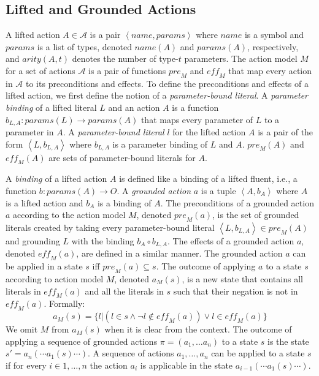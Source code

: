 \documentclass{article}
\newcommand{\tuple}[1]{\ensuremath{\left \langle #1 \right \rangle }}
\newcommand{\pre}{\textit{pre}}
\newcommand{\params}{\textit{params}}
\newcommand{\eff}{\textit{eff}}
\newcommand{\name}{\textit{name}}
\newcommand{\liftl}{L}
\newcommand{\lifta}{A}
\begin{document}
\subsection{Lifted and Grounded Actions}
A lifted action $\lifta\in \mathcal{A}$ is a pair $\tuple{\name, \params}$ 
where $\name$ is a symbol and $\params$ is a list of types, 
denoted $\name(\lifta)$ and $\params(\lifta)$, respectively, and $arity(\lifta,t)$ denotes the number of type-$t$ parameters. 
The action model $M$ for a set of actions $\mathcal{A}$ 
is a pair of functions $\pre_M$ and $\eff_M$ that map every action in $\mathcal{A}$ to its preconditions and effects. 
To define the preconditions and effects of a lifted action, 
we first define the notion of a \emph{parameter-bound literal}. 
A \emph{parameter binding} of a lifted literal $\liftl$ and an action $\lifta$ is a function $b_{\liftl,\lifta}: \params(\liftl)\rightarrow \params(\lifta)$ that maps every parameter of $\liftl$ to a parameter in $\lifta$. 
A \emph{parameter-bound literal} $l$ for the lifted action $\lifta$ is a 
pair of the form $\tuple{\liftl,b_{\liftl,\lifta}}$ where $b_{\liftl,\lifta}$ is a parameter binding of $\liftl$ and $\lifta$. 
$\pre_M(\lifta)$ and $\eff_M(\lifta)$ are sets of parameter-bound literals for $\lifta$. 




A \emph{binding} of a lifted action $\lifta$ is defined like a binding of a lifted fluent, i.e., a function $b:\params(\lifta)\rightarrow O$. 
A \emph{grounded action} $a$ is a tuple $\tuple{\lifta, b_\lifta}$ where $\lifta$ is a lifted action and $b_\lifta$ is a binding of $\lifta$. 
The preconditions of a grounded action $a$ according to the action model $M$, denoted $\pre_M(a)$, is the set of grounded literals created by taking every parameter-bound literal $\tuple{\liftl, b_{\liftl,\lifta}}\in \pre_M(\lifta)$ and grounding $\liftl$ with the binding $b_\lifta\circ b_{\liftl,\lifta}$. 
The effects of a grounded action $a$, denoted $\eff_M(a)$, are defined in a similar manner. 
The grounded action $a$ can be applied in a state $s$ iff $\pre_M(a)\subseteq s$. 
The outcome of applying $a$ to a state $s$ according to action model $M$, denoted $a_M(s)$, is a new state that contains all literals in $\eff_M(a)$ and all the literals in $s$ such that their negation is not in $\eff_M(a)$. 
Formally:
\begin{equation}
    a_M(s)=\{ l | (l\in s \wedge \neg l\notin \eff_M(a)) \vee l\in \eff_M(a) \} 
\end{equation}
We omit $M$ from $a_M(s)$ when it is clear from the context.
The outcome of applying a sequence of grounded actions $\pi=(a_1,\ldots a_n)$ to a state $s$ is the state $s'=a_n(\cdots a_1(s)\cdots)$. 
A sequence of actions $a_1,\ldots, a_n$ can be applied to a state $s$ 
if for every $i\in 1,\ldots,n$ the action $a_i$ is applicable in the state 
$a_{i-1}(\cdots a_1(s)\cdots)$. 
\end{document}
